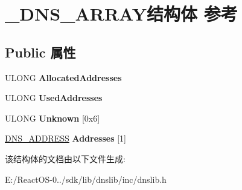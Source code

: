 \hypertarget{struct___d_n_s___a_r_r_a_y}{}\section{\+\_\+\+D\+N\+S\+\_\+\+A\+R\+R\+A\+Y结构体 参考}
\label{struct___d_n_s___a_r_r_a_y}
\subsection*{Public 属性}
\begin{DoxyCompactItemize}
\item 
\mbox{\label{struct___d_n_s___a_r_r_a_y_afce209bd8e7e5e89824b15fccd5f792b}} 
U\+L\+O\+NG {\bfseries Allocated\+Addresses}
\item 
\mbox{\label{struct___d_n_s___a_r_r_a_y_a377682973845fee5069c2bbfd8e24728}} 
U\+L\+O\+NG {\bfseries Used\+Addresses}
\item 
\mbox{\label{struct___d_n_s___a_r_r_a_y_a02c861b0c27a7e58ae9b885dc0409706}} 
U\+L\+O\+NG {\bfseries Unknown} \mbox{[}0x6\mbox{]}
\item 
\mbox{\label{struct___d_n_s___a_r_r_a_y_a62156e459fbe0a20e6ce4280f048ac4e}} 
\hyperlink{struct___d_n_s___a_d_d_r_e_s_s}{D\+N\+S\+\_\+\+A\+D\+D\+R\+E\+SS} {\bfseries Addresses} \mbox{[}1\mbox{]}
\end{DoxyCompactItemize}


该结构体的文档由以下文件生成\+:\begin{DoxyCompactItemize}
\item 
E\+:/\+React\+O\+S-\/0../sdk/lib/dnslib/inc/dnslib.\+h\end{DoxyCompactItemize}
